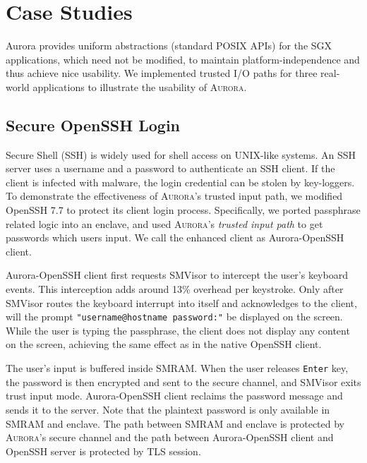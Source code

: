 \documentclass[journal,twocolumn,letterpaper,10pt]{IEEEtran}
\begin{document}
\section{Case Studies}\label{casestudy}

Aurora provides uniform abstractions (standard POSIX APIs) for the SGX applications, which need not be modified, to maintain platform-independence and thus achieve nice usability. We implemented trusted I/O paths for three real-world applications to illustrate the usability of \textsc{Aurora}.

\subsection{Secure OpenSSH Login}\label{openssh}


Secure Shell (SSH) is widely used for shell access on UNIX-like systems. An SSH server uses a username and a password to authenticate an SSH client. If the client is infected with malware, the login credential can be stolen by key-loggers. To demonstrate the effectiveness of \textsc{Aurora}'s trusted input path, we modified OpenSSH 7.7 to protect its client login process. Specifically, we ported passphrase related logic into an enclave, and used \textsc{Aurora}'s \textit{trusted input path} to get passwords which users input. We call the enhanced client as Aurora-OpenSSH client. %

Aurora-OpenSSH client first requests SMVisor to intercept the user's  keyboard events. This interception adds around 13\% overhead per keystroke. Only after SMVisor routes the keyboard interrupt into itself and acknowledges to the client, will the prompt \texttt{"username@hostname password:"}  be displayed on the screen. While the user is typing the passphrase, the client does not display any content on the screen, achieving the same effect as in the native OpenSSH client.

The user's input is buffered inside SMRAM. When the user releases \texttt{Enter} key, the password is then encrypted and sent to the secure channel, and SMVisor exits trust input mode.  Aurora-OpenSSH client reclaims the password message and sends it to the server. Note that the plaintext password is only available in SMRAM and enclave. The path between SMRAM and enclave is protected by \textsc{Aurora}'s secure channel and the path between Aurora-OpenSSH client and OpenSSH server is protected by TLS session.
%
\end{document}
